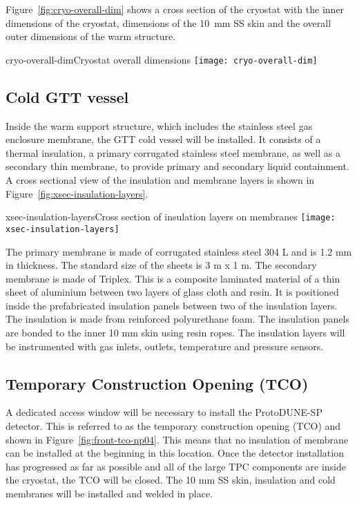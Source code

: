 Figure~\ref{fig:cryo-overall-dim} shows a cross section of the cryostat with the inner dimensions of the cryostat, dimensions of the \SI{10}{mm} SS skin and the overall outer dimensions of the warm structure.

\begin{cdrfigure}{cryo-overall-dim}{Cryostat overall dimensions}
  \texttt{[image: cryo-overall-dim]}
\end{cdrfigure}


\subsection{Cold GTT vessel}

Inside the warm support structure, which includes the stainless steel gas enclosure membrane, the GTT cold vessel will be installed. It consists of a thermal insulation, a primary corrugated stainless steel membrane, as well as a secondary thin membrane, to provide primary and secondary liquid containment. A cross sectional view of the insulation and membrane layers is shown in Figure~\ref{fig:xsec-insulation-layers}.

\begin{cdrfigure}{xsec-insulation-layers}{Cross section of insulation layers on membranes}
  \texttt{[image: xsec-insulation-layers]}
\end{cdrfigure}


The primary membrane is made of corrugated stainless steel 304 L and is 1.2 mm in thickness.  The standard size of the sheets is 3 m x 1 m.  The secondary membrane is made of Triplex.  This is a composite laminated material of a thin sheet of aluminium between two layers of glass cloth and resin.  It is positioned inside the prefabricated insulation panels between two of the insulation layers.    The insulation is made from reinforced polyurethane foam.  The insulation panels are bonded to the inner 10 mm skin using resin ropes.  The insulation layers will be instrumented with gas inlets, outlets, temperature and pressure sensors.


\subsection{Temporary Construction Opening (TCO)}

A dedicated access window will be necessary to install the ProtoDUNE-SP detector.  This is referred to as the temporary construction opening (TCO) and shown in Figure~\ref{fig:front-tco-np04}.  This means that no insulation of membrane can be installed at the beginning in this location. Once the detector installation has progressed as far as possible and all of the large TPC components are inside the cryostat, the TCO will be closed.  The 10 mm SS skin, insulation and cold membranes will be installed and welded in place. 

